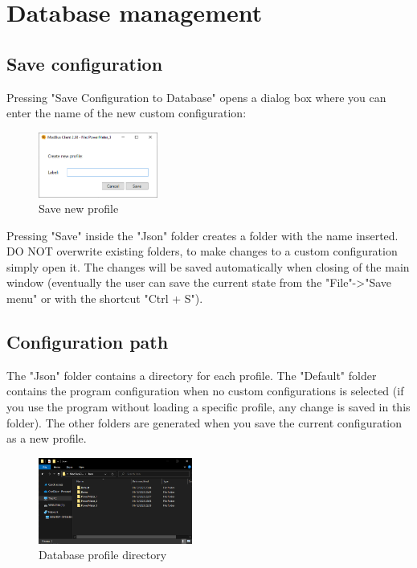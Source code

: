 
\chapter{Database management}

\section{Save configuration}

Pressing "Save Configuration to Database" opens a dialog box where you can enter the
name of the new custom configuration:

\begin{figure}[H]
\centering
\includegraphics[width=0.35\textwidth]{../Img/SaveProfile.PNG}
\caption{Save new profile}
\end{figure}

Pressing "Save" inside the "Json" folder creates a folder with the name inserted.
DO NOT overwrite existing folders, to make changes to a custom configuration
simply open it. The changes will be saved automatically when closing
of the main window (eventually the user can save the current state from the "File"->"Save menu"
or with the shortcut "Ctrl + S").

\section{Configuration path}

The "Json" folder contains a directory for each profile. The
"Default" folder contains the program configuration when no
custom configurations is selected (if you use the program without loading a specific 
profile, any
change is saved in this folder). The other folders are generated when you save the
current configuration as a new profile.

\begin{figure}[H]
\centering
\includegraphics[width=0.45\textwidth]{../Img/DatabaseDirectory.PNG}
\caption{Database profile directory}
\end{figure}

